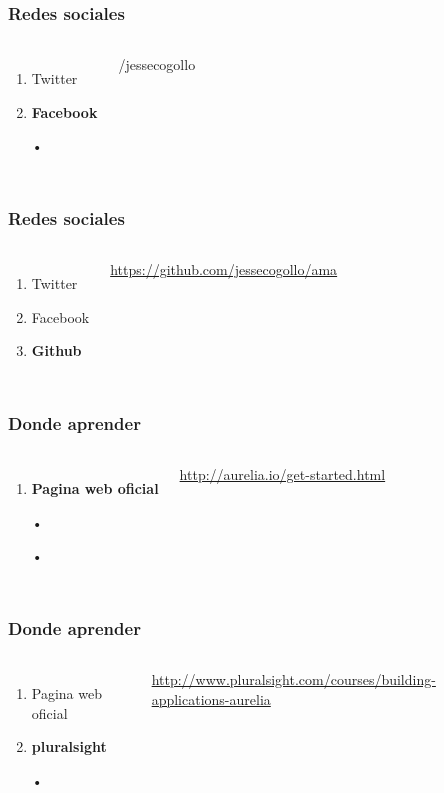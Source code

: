 \documentclass{beamer}
\begin{document}
\begin{frame}
\frametitle{Redes sociales}
\begin{columns}[c]
\begin{enumerate}
\item Twitter
\item \textbf{Facebook}
\item[•]
\end{enumerate}
{\color{blue}/jessecogollo}
\end{columns}
\end{frame}
\begin{frame}
\frametitle{Redes sociales}
\begin{columns}[c]
\begin{enumerate}
\item Twitter
\item Facebook
\item \textbf{Github}
\end{enumerate}
{\color{blue}\url{https://github.com/jessecogollo/ama}}
\end{columns}
\end{frame}
\begin{frame}
\frametitle{Donde aprender}
\begin{columns}[c]
\begin{enumerate}
\item \textbf{Pagina web oficial}
\item[•]
\item[•]
\end{enumerate}
{\color{blue}\url{http://aurelia.io/get-started.html}}
\end{columns}
\end{frame}
\begin{frame}
\frametitle{Donde aprender}
\begin{columns}[c]
\begin{enumerate}
\item Pagina web oficial
\item \textbf{pluralsight}
\item[•]
\end{enumerate}
{\color{blue}\url{http://www.pluralsight.com/courses/building-applications-aurelia}}
\end{columns}
\end{frame}
\end{document}
